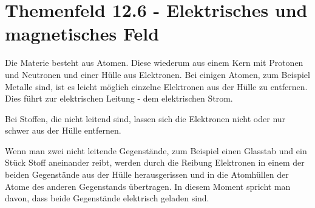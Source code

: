 \documentclass[a4paper]{article}
\begin{document}
%
%

  \part{Themenfeld 12.6 - Elektrisches und magnetisches Feld}
  Die Materie besteht aus Atomen. Diese wiederum aus einem Kern mit Protonen und Neutronen und einer Hülle aus Elektronen. Bei einigen Atomen, zum Beispiel Metalle sind, ist es leicht möglich einzelne Elektronen aus der Hülle zu entfernen. Dies führt zur elektrischen Leitung - dem elektrischen Strom.

  Bei Stoffen, die nicht leitend sind, lassen sich die Elektronen nicht oder nur schwer aus der Hülle entfernen.

  Wenn man zwei nicht leitende Gegenstände, zum Beispiel einen Glasstab und ein Stück Stoff aneinander reibt, werden durch die Reibung Elektronen in einem der beiden Gegenstände aus der Hülle herausgerissen und in die Atomhüllen der Atome des anderen Gegenstands übertragen. In diesem Moment spricht man davon, dass beide Gegenstände elektrisch geladen sind.
\end{document}
